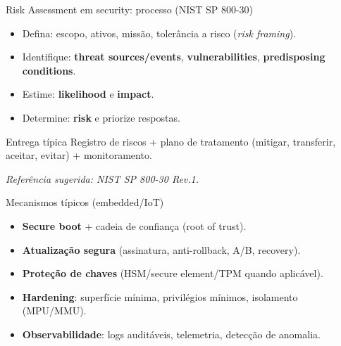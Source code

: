 \documentclass{beamer}
\begin{document}
\begin{frame}{Risk Assessment em security: processo (NIST SP 800-30)}
\begin{itemize}
  \item Defina: escopo, ativos, missão, tolerância a risco (\textit{risk framing}).
  \item Identifique: \textbf{threat sources/events}, \textbf{vulnerabilities}, \textbf{predisposing conditions}.
  \item Estime: \textbf{likelihood} e \textbf{impact}.
  \item Determine: \textbf{risk} e priorize respostas.
\end{itemize}

\begin{block}{Entrega típica}
Registro de riscos + plano de tratamento (mitigar, transferir, aceitar, evitar) + monitoramento.
\end{block}

\small
\textit{Referência sugerida: NIST SP 800-30 Rev.1.}
\end{frame}


\begin{frame}{Mecanismos típicos (embedded/IoT)}
\begin{itemize}
  \item \textbf{Secure boot} + cadeia de confiança (root of trust).
  \item \textbf{Atualização segura} (assinatura, anti-rollback, A/B, recovery).
  \item \textbf{Proteção de chaves} (HSM/secure element/TPM quando aplicável).
  \item \textbf{Hardening}: superfície mínima, privilégios mínimos, isolamento (MPU/MMU).
  \item \textbf{Observabilidade}: logs auditáveis, telemetria, detecção de anomalia.
\end{itemize}

\end{frame}
\end{document}
